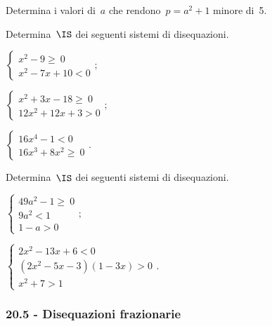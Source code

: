\begin{esercizio}[\Ast]
 \label{ese:20.54}
 Determina i valori di~$a$ che rendono~$p=a^{2}+1$ minore di~5.
\end{esercizio}

\begin{esercizio}[\Ast]
 \label{ese:20.55}
 Determina~$\IS$ dei seguenti sistemi di disequazioni.
 \begin{multicols}{3}
 \begin{enumeratea}
 \item $\left\{\begin{array}{l}
		x^{2}-9\ge~0\\
		x^{2}-7x+10<0
	   \end{array}\right.;$
\item $\left\{\begin{array}{l}
		x^{2}+3x-18\ge~0\\
		12x^{2}+12x+3>0
	   \end{array}\right.;$
\item $\left\{\begin{array}{l}
		16x^{4}-1<0 \\
		16x^{3}+8x^{2}\ge~0 \end{array}\right.. $
 \end{enumeratea}
 \end{multicols}
\end{esercizio}

\begin{esercizio}[\Ast]
 \label{ese:20.56}
 Determina~$\IS$ dei seguenti sistemi di disequazioni.
 \begin{multicols}{2}
 \begin{enumeratea}
 \item $\left\{\begin{array}{l}
		49a^{2}-1\ge~0\\
		9a^{2}<1\\
		1-a>0
	   \end{array}\right.;$

\item $\left\{\begin{array}{l}
	  2x^{2}-13x+6<0\\
	  (2x^{2}-5x-3)(1-3x)>0\\
	  x^{2}+7>1
	   \end{array}\right..$
 \end{enumeratea}
 \end{multicols}
\end{esercizio}

\subsubsection*{20.5 - Disequazioni frazionarie}

